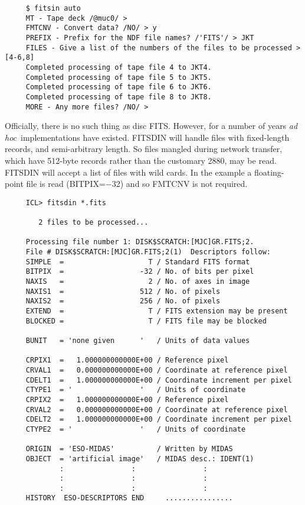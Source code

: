 {\small
\begin{verbatim}
     $ fitsin auto
     MT - Tape deck /@muc0/ >
     FMTCNV - Convert data? /NO/ > y
     PREFIX - Prefix for the NDF file names? /'FITS'/ > JKT
     FILES - Give a list of the numbers of the files to be processed > [4-6,8]
     Completed processing of tape file 4 to JKT4.
     Completed processing of tape file 5 to JKT5.
     Completed processing of tape file 6 to JKT6.
     Completed processing of tape file 8 to JKT8.
     MORE - Any more files? /NO/ >
\end{verbatim}
\normalsize
Officially, there is no such thing as disc FITS.  However, for a number
of years {\it ad hoc}\ implementations have existed.  FITSDIN will
handle files with fixed-length records, and semi-arbitrary length.  So
files mangled during network transfer, which have 512-byte records
rather than the customary 2880, may be read.  FITSDIN will accept
a list of files with wild cards. In the example a floating-point
file is read (BITPIX=$-$32) and so FMTCNV is not required.

\small
\begin{verbatim}
     ICL> fitsdin *.fits

        2 files to be processed...
 
     Processing file number 1: DISK$SCRATCH:[MJC]GR.FITS;2.
     File # DISK$SCRATCH:[MJC]GR.FITS;2(1)  Descriptors follow:
     SIMPLE  =                    T / Standard FITS format
     BITPIX  =                  -32 / No. of bits per pixel
     NAXIS   =                    2 / No. of axes in image
     NAXIS1  =                  512 / No. of pixels
     NAXIS2  =                  256 / No. of pixels
     EXTEND  =                    T / FITS extension may be present
     BLOCKED =                    T / FITS file may be blocked
     
     BUNIT   = 'none given      '   / Units of data values
     
     CRPIX1  =   1.000000000000E+00 / Reference pixel
     CRVAL1  =   0.000000000000E+00 / Coordinate at reference pixel
     CDELT1  =   1.000000000000E+00 / Coordinate increment per pixel
     CTYPE1  = '                '   / Units of coordinate
     CRPIX2  =   1.000000000000E+00 / Reference pixel
     CRVAL2  =   0.000000000000E+00 / Coordinate at reference pixel
     CDELT2  =   1.000000000000E+00 / Coordinate increment per pixel
     CTYPE2  = '                '   / Units of coordinate
 
     ORIGIN  = 'ESO-MIDAS'          / Written by MIDAS
     OBJECT  = 'artificial image'   / MIDAS desc.: IDENT(1)
             :                :                :
             :                :                :
             :                :                :
     HISTORY  ESO-DESCRIPTORS END     ................
     

\end{verbatim}}
